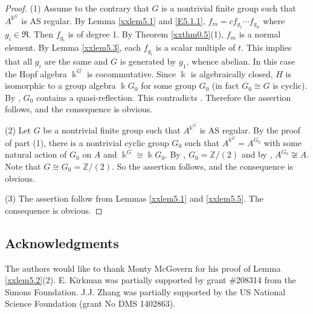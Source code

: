 \begin{proof}
(1) Assume to the contrary that $G$ is a nontrivial finite group
such that $A^{\Bbbk^G}$ is AS regular. By Lemma \ref{xxlem5.1} and 
\eqref{E5.1.1}, $f_m=cf_{g_1}\cdots f_{g_w}$ where 
$g_i\in \Re$. Then $f_{g_i}$ is of degree 1. By 
Theorem \ref{xxthm0.5}(1), $f_m$ is a normal 
element. By Lemma \ref{xxlem5.3}, each $f_{g_i}$ is a
scalar multiple of $t$. This implies that all
$g_i$ are the same and $G$ is generated by $g_1$,
whence abelian. In this case the Hopf algebra
$\Bbbk^G$ is cocommutative. Since $\Bbbk$ is 
algebraically closed, $H$ is isomorphic to 
a group algebra $\Bbbk G_0$ for some group
$G_0$ (in fact $G_0\cong G$ is cyclic). By \cite[Theorem 2.4]{KKZ1},
$G_0$ contains a quasi-reflection. This contradicts  
\cite[Lemma 6.5(d)]{KKZ1}. Therefore the assertion follows,
and the consequence is obvious. 

(2) Let $G$ be a nontrivial finite group such that $A^{\Bbbk^G}$ 
is AS regular. By the proof of part (1), there is a 
nontrivial cyclic group $G_0$ such that $A^{\Bbbk^G}=A^{G_0}$
with some natural action of $G_0$ on $A$ and $\Bbbk^G\cong \Bbbk G_0$. 
By \cite[Proposition 6.7]{KKZ1}, $G_0={\mathbb Z}/(2)$ and
by \cite[Corollary 6.8]{KKZ1}, $A^{G_0}\not\cong A$. Note that $G\cong G_0
={\mathbb Z}/(2)$. So the assertion follows, and the consequence is obvious.

(3) The assertion follow from Lemmas \ref{xxlem5.1} and \ref{xxlem5.5}.
The consequence is obvious.
\end{proof}

\subsection*{Acknowledgments}

The authors would like to thank Monty McGovern for his proof of Lemma \ref{xxlem5.2}(2).
E. Kirkman was partially supported by
grant \#208314 from the Simons Foundation. J.J. Zhang was partially supported
by the US National Science Foundation (grant No DMS 1402863).

